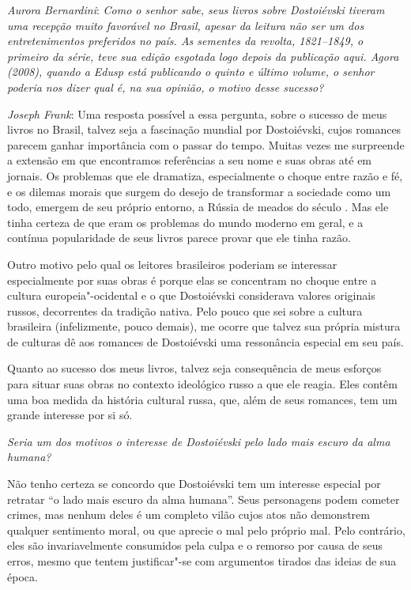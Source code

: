 {{\medskip

\noindent
\emph{Aurora Bernardini}: \emph{Como o senhor sabe, seus livros sobre Dostoiévski tiveram
uma recepção muito favorável no Brasil, apesar da leitura não ser um
dos entretenimentos preferidos no país. \emph{As sementes da revolta,
1821--1849}, o primeiro da série, teve sua edição esgotada logo depois da
publicação aqui. Agora (2008), quando a Edusp está publicando o quinto e último
volume, o senhor poderia nos dizer qual é, na sua opinião, o motivo
desse sucesso?}


\noindent
\emph{Joseph Frank}: Uma resposta possível a essa pergunta, sobre o
sucesso de meus livros no Brasil, talvez seja a fascinação mundial por
Dostoiévski, cujos romances parecem ganhar importância com o passar do
tempo. Muitas vezes me surpreende a extensão em que encontramos
referências a seu nome e suas obras até em jornais. Os problemas que ele
dramatiza, especialmente o choque entre razão e fé, e os dilemas morais
que surgem do desejo de transformar a sociedade como um todo,
emergem de seu próprio entorno, a Rússia de meados do século . Mas ele
tinha certeza de que eram os problemas do mundo moderno em geral, e a
contínua popularidade de seus livros parece provar que ele tinha razão.

Outro motivo pelo qual os leitores brasileiros poderiam se interessar
especialmente por suas obras é porque elas se concentram no choque entre
a cultura europeia"-ocidental e o que Dostoiévski considerava valores
originais russos, decorrentes da tradição nativa. Pelo pouco que sei
sobre a cultura brasileira (infelizmente, pouco demais), me
ocorre que talvez sua própria mistura de culturas dê aos romances de
Dostoiévski uma ressonância especial em seu país.

Quanto ao sucesso dos meus livros, talvez seja consequência de meus
esforços para situar suas obras no contexto ideológico russo a que ele
reagia. Eles contêm uma boa medida da história cultural russa, que, além
de seus romances, tem um grande interesse por si só.

\medskip

\emph{Seria um dos motivos o interesse de Dostoiévski pelo lado mais
escuro da alma humana?}

Não tenho certeza se concordo que Dostoiévski tem um interesse
especial por retratar ``o lado mais escuro da alma humana''. Seus
personagens podem cometer crimes, mas nenhum deles é um completo vilão
cujos atos não demonstrem qualquer sentimento moral, ou que aprecie o
mal pelo próprio mal. Pelo contrário, eles são invariavelmente
consumidos pela culpa e o remorso por causa de seus erros, mesmo que
tentem justificar"-se com argumentos tirados das ideias de sua época.

}}
